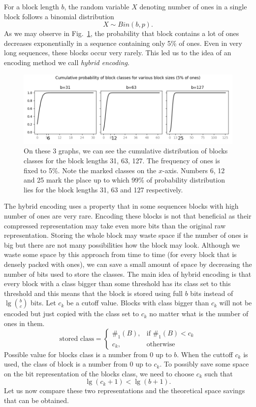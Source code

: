 For a block length $b$, the random variable $X$ denoting number of ones in a single
block follows a binomial distribution $$X \sim Bin(b, p).$$ As we may observe in
Fig.~\ref{obr:hybridEncodingDistribution}, the probability that block contains
a lot of ones decreases exponentially in a sequence containing only 5\% of ones.
Even in very long sequences, these blocks occur very rarely. This led us to the
idea of an encoding method we call \textit{hybrid encoding}.

\begin{figure}
	\centerline{
		\includegraphics[width=\textwidth]{images/hybrid_encoding_motivation}
	}
	\caption[TODO]{On these 3 graphs, we can see the cumulative distribution
    of blocks classes for the block lengths 31, 63, 127. The frequency of ones is
    fixed to 5\%. Note the marked classes on the $x$-axis. Numbers 6, 12 and
    25 mark the place up to which 99\% of probability distribution lies for
    the block lengths 31, 63 and 127 respectively.
	}
	\label{obr:hybridEncodingDistribution}
\end{figure}

The hybrid encoding uses a property that in some sequences blocks with high number
of ones are very rare. Encoding these blocks is not that beneficial as their
compressed representation may take even more bits than the original raw
representation. Storing the whole block may waste space if the number of
ones is big but there are not many possibilities how the block may look.
Although we waste some space by this approach from time to time (for every
block that is densely packed with ones), we can save a small amount of space
by decreasing the number of bits used to store the classes. The main idea
of hybrid encoding is that every block with a class bigger than some threshold
has its class set to this threshold and this means that the block
is stored using full $b$ bits instead of $\lg {b\choose c}$ bits.
Let $c_k$ be a cutoff value. Blocks with class bigger than $c_k$ will not be
encoded but just copied with the class set to $c_k$ no matter what is the
number of ones in them.
\[
    \text{stored class} = 
\begin{cases}
    \#_1(B),& \text{if } \#_1(B) < c_k\\
    c_k,              & \text{otherwise}
\end{cases}
\]
Possible value for blocks class is a number from 0 up to $b$. When the cuttoff $c_k$ is
used, the class of block is a number from 0 up to $c_k$. To possibly save some space on
the bit representation of the blocks class, we need to choose $c_k$ such that
$$\lg (c_k+1) < \lg (b+1).$$ Let us now compare these two representations
and the theoretical space savings that can be obtained.

